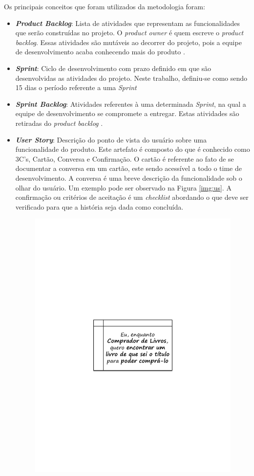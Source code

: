 Os principais conceitos que foram utilizados da metodologia foram:
\begin{itemize}
\item \textit{\textbf{Product Backlog}}: Lista de atividades que representam as funcionalidades que serão construídas no projeto. O \textit{product owner} é quem escreve o \textit{product backlog}. Essas atividades são mutáveis ao decorrer do projeto, pois a equipe de desenvolvimento acaba conhecendo mais do produto \cite{sabbagh_scrum:_2014}.
\item \textit{\textbf{Sprint}}: Ciclo de desenvolvimento com prazo definido em que são desenvolvidas as atividades do projeto. Neste trabalho, definiu-se como sendo 15 dias o período referente a uma \textit{Sprint}
\item \textit{\textbf{Sprint Backlog}}: Atividades referentes à uma determinada \textit{Sprint}, na qual a equipe de desenvolvimento se compromete a entregar. Estas atividades são retiradas do \textit{product backlog} \cite{mahnic_case_2011}.
\item \textbf{\textit{User Story}}: Descrição do ponto de vista do usuário sobre uma funcionalidade do produto. Este artefato é composto do que é conhecido como 3C's, Cartão, Conversa e Confirmação. O cartão é referente ao fato de se documentar a conversa em um cartão, este sendo acessível a todo o time de desenvolvimento. A conversa é uma breve descrição da funcionalidade sob o olhar do usuário. Um exemplo pode ser observado na Figura \ref{img:us}. A confirmação ou critérios de aceitação é um \textit{checklist} abordando o que deve ser verificado para que a história seja dada como concluída.
\graphicspath{{figuras/}}
\begin{figure}[H]
\centering
\includegraphics[scale=0.80]{US}

\end{figure}
\end{itemize}
